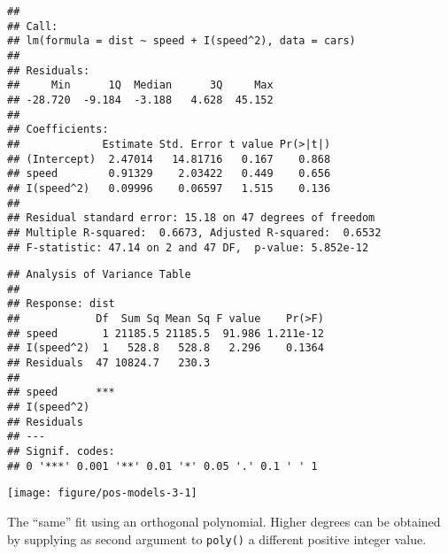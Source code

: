 \documentclass[paper=a4,headsepline,BCOR=12mm,twoside,open=right,%
titlepage,headings=small,fontsize=10pt,index=totoc,bibliography=totoc,%
captions=tableheading,captions=nooneline]{scrbook}\usepackage{knitr}
\begin{document}
\begin{knitrout}\footnotesize
{}\color{fgcolor}\begin{kframe}
\begin{alltt}
 \hlkwb{<-}  \hlopt{~}  \hlopt{+} \hlopt{^}\hlstd{),}  
  \hlstd{=} \hlstd{)} 
 
\end{alltt}
\begin{verbatim}
## 
## Call:
## lm(formula = dist ~ speed + I(speed^2), data = cars)
## 
## Residuals:
##     Min      1Q  Median      3Q     Max 
## -28.720  -9.184  -3.188   4.628  45.152 
## 
## Coefficients:
##             Estimate Std. Error t value Pr(>|t|)
## (Intercept)  2.47014   14.81716   0.167    0.868
## speed        0.91329    2.03422   0.449    0.656
## I(speed^2)   0.09996    0.06597   1.515    0.136
## 
## Residual standard error: 15.18 on 47 degrees of freedom
## Multiple R-squared:  0.6673,	Adjusted R-squared:  0.6532 
## F-statistic: 47.14 on 2 and 47 DF,  p-value: 5.852e-12
\end{verbatim}
\begin{alltt}
 
\end{alltt}
\begin{verbatim}
## Analysis of Variance Table
## 
## Response: dist
##            Df  Sum Sq Mean Sq F value    Pr(>F)
## speed       1 21185.5 21185.5  91.986 1.211e-12
## I(speed^2)  1   528.8   528.8   2.296    0.1364
## Residuals  47 10824.7   230.3                  
##               
## speed      ***
## I(speed^2)    
## Residuals     
## ---
## Signif. codes:  
## 0 '***' 0.001 '**' 0.01 '*' 0.05 '.' 0.1 ' ' 1
\end{verbatim}
\end{kframe}

{\centering \texttt{[image: figure/pos-models-3-1]} 

}



\end{knitrout}

The ``same'' fit using an orthogonal polynomial. Higher degrees can be obtained by supplying as second argument to \texttt{poly()} a different positive integer value.
\end{document}
